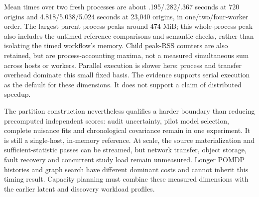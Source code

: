 Mean times over two fresh processes are about .195/.282/.367 seconds at
720 origins and 4.818/5.038/5.024 seconds at 23,040 origins, in
one/two/four-worker order. The largest parent process peaks around 474 MiB;
this whole-process peak also includes the untimed reference comparisons and
semantic checks, rather than isolating the timed workflow's memory.
Child peak-RSS counters are also retained, but are process-accounting maxima,
not a measured simultaneous sum across hosts or workers. Parallel execution
is slower here: process and transfer overhead dominate this small fixed
basis. The evidence supports serial execution as the default for these
dimensions. It does not support a claim of distributed speedup.

The partition construction nevertheless qualifies a harder boundary than
reducing precomputed independent scores: audit uncertainty, pilot model
selection, complete nuisance fits and chronological covariance remain in
one experiment. It is still a single-host, in-memory reference. At scale,
the source materialization and sufficient-statistic passes can be streamed,
but network transfer, object storage, fault recovery and concurrent study
load remain unmeasured. Longer POMDP histories and graph search have
different dominant costs and cannot inherit this timing result. Capacity
planning must combine these measured dimensions with the earlier latent
and discovery workload profiles.

